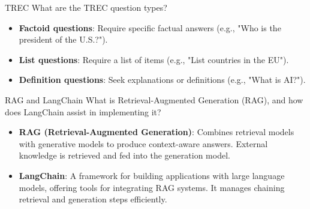 \documentclass{article}
\begin{document}
\begin{exercise}{TREC}\label{ex:trec}
  What are the TREC question types?

  \begin{solution}
    \begin{itemize}
        \item \textbf{Factoid questions}: Require specific factual answers (e.g., "Who is the president of the U.S.?").
        \item \textbf{List questions}: Require a list of items (e.g., "List countries in the EU").
        \item \textbf{Definition questions}: Seek explanations or definitions (e.g., "What is AI?").
    \end{itemize}
  \end{solution}
\end{exercise}

\begin{exercise}{RAG and LangChain}\label{ex:rag}
  What is Retrieval-Augmented Generation (RAG), and how does LangChain assist in implementing it?

  \begin{solution}
    \begin{itemize}
        \item \textbf{RAG (Retrieval-Augmented Generation)}: Combines retrieval models with generative models to produce context-aware answers. External knowledge is retrieved and fed into the generation model.
        \item \textbf{LangChain}: A framework for building applications with large language models, offering tools for integrating RAG systems. It manages chaining retrieval and generation steps efficiently.
    \end{itemize}
  \end{solution}
\end{exercise}
\end{document}
